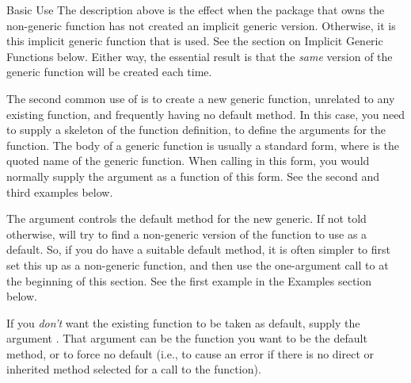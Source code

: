 \begin{Section}{Basic Use}
The description above is the effect when the package that owns the
non-generic function has not created an implicit generic version.
Otherwise, it is this implicit generic function that is used. See the
section on Implicit Generic Functions below.  Either way, the
essential result is that the \emph{same} version of the generic
function will be created each time.

The second common use of  is to create a new
generic function, unrelated to any existing function, and frequently
having no default method.  In this case, you need to supply a skeleton
of the function definition, to define the arguments for the function.
The body of a generic function is usually a standard form,
 where  is the quoted name of
the generic function.  When calling  in this form,
you would normally supply the  argument as a function of
this form.  See the second and third examples below.

The  argument controls the default method for the
new generic.  If not told otherwise,  will try to
find a non-generic version of the function to use as a default.  So,
if you do have a suitable default method, it is often simpler to first
set this up as a non-generic function, and then use the one-argument
call to  at the beginning of this section.  See the
first example in the Examples section below.

If you \emph{don't} want the existing function to be taken as default,
supply the argument .  That argument can be the
function you want to be the default method, or  to force
no default (i.e., to cause an error if there is no direct or inherited
method selected for a call to the function).
\end{Section}
%
